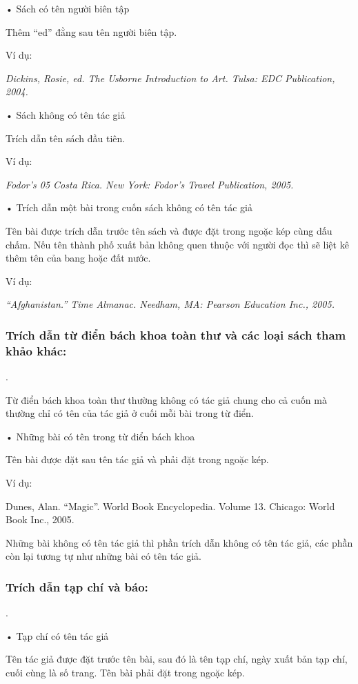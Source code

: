 \documentclass{hcmutarticle}
\begin{document}
•	Sách có tên người biên tập

Thêm “ed” đằng sau tên người biên tập.

Ví dụ:

{\em Dickins, Rosie, ed. The Usborne Introduction to Art. Tulsa: EDC Publication, 2004.}

•	Sách không có tên tác giả

Trích dẫn tên sách đầu tiên.

Ví dụ:

{\em Fodor’s 05 Costa Rica. New York: Fodor’s Travel Publication, 2005.}

•	Trích dẫn một bài trong cuốn sách không có tên tác giả

Tên bài được trích dẫn trước tên sách và được đặt trong ngoặc kép cùng dấu chấm. Nếu tên thành phố xuất bản không quen thuộc với người đọc thì sẽ liệt kê thêm tên của bang hoặc đất nước.

Ví dụ:

{\em “Afghanistan.” Time Almanac. Needham, MA: Pearson Education Inc., 2005.}

\subsubsection{Trích dẫn từ điển bách khoa toàn thư và các loại sách tham khảo khác:}.	

Từ điển bách khoa toàn thư thường không có tác giả chung cho cả cuốn mà thường chỉ có tên của tác giả ở cuối mỗi bài trong từ điển.

•	 Những bài có tên trong từ điển bách khoa

Tên bài được đặt sau tên tác giả và phải đặt trong ngoặc kép.

Ví dụ:

Dunes, Alan. “Magic”. World Book Encyclopedia. Volume 13. Chicago: World Book Inc., 2005.

Những bài không có tên tác giả thì phần trích dẫn không có tên tác giả, các phần còn lại tương tự như những bài có tên tác giả.

\subsubsection{Trích dẫn tạp chí và báo:}.

•	Tạp chí có tên tác giả

Tên tác giả được đặt trước tên bài, sau đó là tên tạp chí, ngày xuất bản tạp chí, cuối cùng là số trang. Tên bài phải đặt trong ngoặc kép.
\end{document}
